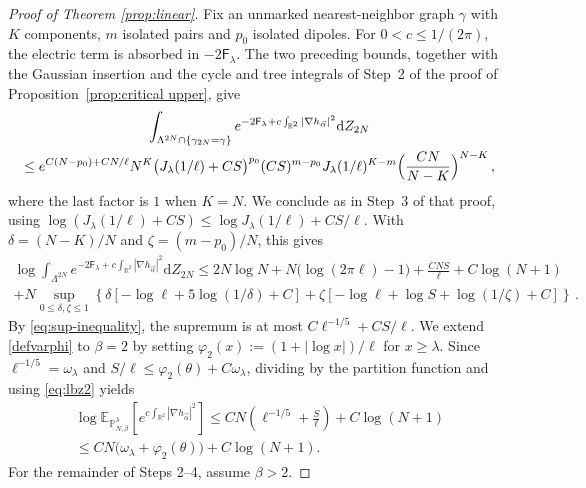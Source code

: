 \documentclass[a4paper,10pt,leqno]{amsart}
\numberwithin{equation}{section}
\newcommand{\R}{\mathbb{R}}
\newcommand{\dd}{\mathrm{d}}
\def\Esp{\mathbb{E}}
\def\nab{\nabla}
\def\P{\mathbb{P}_{N,\beta}^{\lambda}}
\def\F{\mathsf{F}}
\begin{document}
\begin{proof}[Proof of Theorem \ref{prop:linear}]
  Fix an unmarked nearest-neighbor graph $\gamma$ with $K$ components, $m$ isolated pairs and $p_0$ isolated dipoles. For $0<c\le1/(2\pi)$, the electric term is absorbed in $-2\F_\lambda$. The two preceding bounds, together with the Gaussian insertion and the cycle and tree integrals of Step~2 of the proof of Proposition~\ref{prop:critical upper}, give
  \begin{multline*}
    \int_{\Lambda^{2N}\cap\{\gamma_{2N}=\gamma\}}e^{-2\F_\lambda+c\int_{\R^2}|\nab h_{\vec\alpha}|^2}\dd Z_{2N}\\
    \le e^{C(N-p_0)+CN/\ell}N^K\bigl(J_\lambda(1/\ell)+CS\bigr)^{p_0}(CS)^{m-p_0}J_\lambda(1/\ell)^{K-m}\Bigl(\frac{CN}{N-K}\Bigr)^{N-K}\,,
  \end{multline*}
  where the last factor is $1$ when $K=N$. We conclude as in Step~3 of that proof, using $\log(J_\lambda(1/\ell)+CS)\le\log J_\lambda(1/\ell)+CS/\ell$. With $\delta=(N-K)/N$ and $\zeta=(m-p_0)/N$, this gives
  \begin{multline*}
    \log\int_{\Lambda^{2N}}e^{-2\F_\lambda+c\int_{\R^2}|\nab h_{\vec\alpha}|^2}\dd Z_{2N}
    \le2N\log N+N\bigl(\log(2\pi\ell)-1\bigr)
    +\frac{CNS}{\ell}+C\log(N+1)\\
    +N\sup_{0\le\delta,\zeta\le1}\left\{
    \delta\left[-\log\ell+5\log(1/\delta)+C\right]
    +\zeta\left[-\log\ell+\log S+\log(1/\zeta)+C\right]\right\}\,.
  \end{multline*}
  By \eqref{eq:sup-inequality}, the supremum is at most $C\ell^{-1/5}+CS/\ell$. We extend \eqref{defvarphi} to $\beta=2$ by setting $\varphi_2(x):=(1+|\log x|)/\ell$ for $x\ge\lambda$. Since $\ell^{-1/5}=\omega_\lambda$ and $S/\ell\le\varphi_2(\theta)+C\omega_\lambda$, dividing by the partition function and using \eqref{eq:lbz2} yields
  \begin{multline}\label{eq:critical electric}
    \log\Esp_{\P}\left[e^{c\int_{\R^2}|\nabla h_{\vec\alpha}|^2}\right]
    \le CN\left(\ell^{-1/5}+\frac S\ell\right)+C\log(N+1)\\
    \le CN\bigl(\omega_\lambda+\varphi_2(\theta)\bigr)+C\log(N+1).
  \end{multline}
  For the remainder of Steps 2--4, assume $\beta>2$.


\end{proof}
\end{document}
